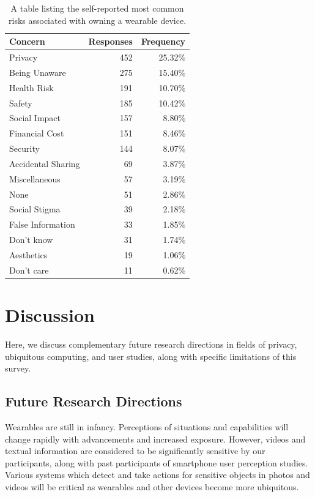 \documentclass{acm_proc_article-sp}
\begin{document}
\begin{table}[t]
\begin{center}
\begin{tabular}{|l|r|r|}
\hline
Concern &  Responses &  Frequency   \\
\hline
Privacy & 452 & 25.32\% \\
Being Unaware & 275 & 15.40\% \\
Health Risk & 191 & 10.70\%\\
Safety & 185 & 10.42\%\\
Social Impact &	157 & 8.80\%\\
Financial Cost & 151 & 8.46\%\\
Security &	144 & 8.07\%\\
Accidental Sharing &	69 & 3.87\%\\
Miscellaneous &	57 & 3.19\%\\
None	& 51 & 2.86\%\\
Social Stigma &	39 & 2.18\%\\
False Information & 33 & 1.85\%\\
Don't know & 31 & 1.74\%\\
Aesthetics 	& 19 & 1.06\%\\
Don't care 	& 11 & 0.62\%\\
\hline
\end{tabular}
\caption{A table listing the self-reported most common risks associated with owning a wearable device.}
\label{openresponses}
\end{center}
\end{table}


\section{Discussion}
Here, we discuss complementary future research directions in fields of privacy, ubiquitous computing, and user studies, along with specific limitations of this survey. 

\subsection{Future Research Directions}
Wearables are still in infancy. Perceptions of situations and capabilities will change rapidly with advancements and increased exposure. However, videos and textual information are considered to be significantly sensitive by our participants, along with past participants of smartphone user perception studies. Various systems which detect and take actions for sensitive objects in photos and videos will be critical as wearables and other devices become more ubiquitous.
\end{document}
